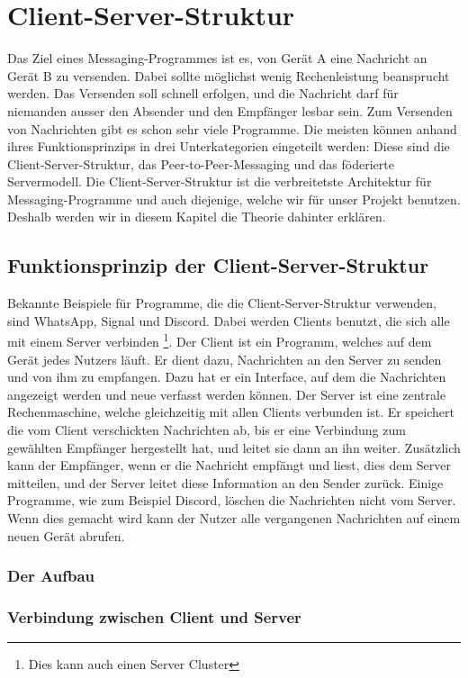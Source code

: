\chapter{Client-Server-Struktur}

Das Ziel eines Messaging-Programmes ist es, von Gerät A eine Nachricht an Gerät B zu versenden. Dabei sollte möglichst wenig Rechenleistung beansprucht werden. Das Versenden soll schnell erfolgen, und die Nachricht darf für niemanden ausser den Absender und den Empfänger lesbar sein. Zum Versenden von Nachrichten gibt es schon sehr viele Programme. Die meisten können anhand ihres Funktionsprinzips in drei Unterkategorien eingeteilt werden: Diese sind die Client-Server-Struktur, das Peer-to-Peer-Messaging und das föderierte Servermodell. Die Client-Server-Struktur ist die verbreitetste Architektur für Messaging-Programme und auch diejenige, welche wir für unser Projekt benutzen. Deshalb werden wir in diesem Kapitel die Theorie dahinter erklären.
\section{Funktionsprinzip der Client-Server-Struktur}
Bekannte Beispiele für Programme, die die Client-Server-Struktur verwenden, sind WhatsApp, Signal und Discord. Dabei werden Clients benutzt, die sich alle mit einem Server verbinden \footnote{Dies kann auch einen Server Cluster }. Der Client ist ein Programm, welches auf dem Gerät jedes Nutzers läuft. Er dient dazu, Nachrichten an den Server zu senden und von ihm zu empfangen. Dazu hat er ein Interface, auf dem die Nachrichten angezeigt werden und neue verfasst werden können. Der Server ist eine zentrale Rechenmaschine, welche gleichzeitig mit allen Clients verbunden ist. Er speichert die vom Client verschickten Nachrichten ab, bis er eine Verbindung zum gewählten Empfänger hergestellt hat, und leitet sie dann an ihn weiter. Zusätzlich kann der Empfänger, wenn er die Nachricht empfängt und liest, dies dem Server mitteilen, und der Server leitet diese Information an den Sender zurück. Einige Programme, wie zum Beispiel Discord, löschen die Nachrichten nicht vom Server. Wenn dies gemacht wird kann der Nutzer alle vergangenen Nachrichten auf einem neuen Gerät abrufen.
\subsection{Der Aufbau}
\subsection{Verbindung zwischen Client und Server}
